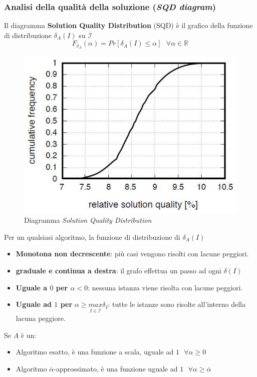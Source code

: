 \documentclass{article}
\begin{document}
\subsubsection{Analisi della qualità della soluzione (\textit{SQD diagram})}
Il diagramma \textbf{Solution Quality Distribution} (SQD) è il grafico della funzione di distribuzione $\delta_A(I)$ su
$\overline{\mathcal{I}}$
$$F_{\delta_A}(\alpha) = Pr[\delta_A (I)\leq\alpha]\text{   }\forall\alpha\in\mathbb{R}$$
\begin{figure}[H]
    \centering
    \includegraphics[scale=0.4]{images/SQD_0.png}
    \caption{Diagramma \textit{Solution Quality Distribution}}
\end{figure}
Per un qualsiasi algoritmo, la funzione di distribuzione di $\delta_A(I)$
\begin{itemize}
    \item \textbf{Monotona non decrescente}: più casi vengono risolti con lacune peggiori.
    \item \textbf{graduale e continua a destra}: il grafo effettua un passo ad ogni $\delta(I)$
    \item \textbf{Uguale a $0$ per $\alpha <0$}: nessuna istanza viene risolta con lacune peggiori.
    \item \textbf{Uguale ad $1$ per} $\alpha\geq\underset{I\in\overline{\mathcal{I}}}{max}\delta_I$: tutte le istanze sono risolte all'interno della lacuna peggiore.
\end{itemize}

Se $A$ è un:
\begin{itemize}
    \item Algoritmo esatto, è una funzione a scala, uguale ad $1\text{   }\forall\alpha\geq0$
    \item Algoritmo $\overline{\alpha}$-approssimato, è una funzione uguale ad $1\text{   }\forall\alpha\geq\overline{\alpha}$
\end{itemize}
\end{document}
